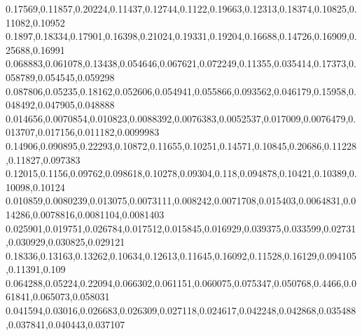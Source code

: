 0.17569,0.11857,0.20224,0.11437,0.12744,0.1122,0.19663,0.12313,0.18374,0.10825,0.11082,0.10952
0.1897,0.18334,0.17901,0.16398,0.21024,0.19331,0.19204,0.16688,0.14726,0.16909,0.25688,0.16991
0.068883,0.061078,0.13438,0.054646,0.067621,0.072249,0.11355,0.035414,0.17373,0.058789,0.054545,0.059298
0.087806,0.05235,0.18162,0.052606,0.054941,0.055866,0.093562,0.046179,0.15958,0.048492,0.047905,0.048888
0.014656,0.0070854,0.010823,0.0088392,0.0076383,0.0052537,0.017009,0.0076479,0.013707,0.017156,0.011182,0.0099983
0.14906,0.090895,0.22293,0.10872,0.11655,0.10251,0.14571,0.10845,0.20686,0.11228,0.11827,0.097383
0.12015,0.1156,0.09762,0.098618,0.10278,0.09304,0.118,0.094878,0.10421,0.10389,0.10098,0.10124
0.010859,0.0080239,0.013075,0.0073111,0.008242,0.0071708,0.015403,0.0064831,0.014286,0.0078816,0.0081104,0.0081403
0.025901,0.019751,0.026784,0.017512,0.015845,0.016929,0.039375,0.033599,0.02731,0.030929,0.030825,0.029121
0.18336,0.13163,0.13262,0.10634,0.12613,0.11645,0.16092,0.11528,0.16129,0.094105,0.11391,0.109
0.064288,0.05224,0.22094,0.066302,0.061151,0.060075,0.075347,0.050768,0.4466,0.061841,0.065073,0.058031
0.041594,0.03016,0.026683,0.026309,0.027118,0.024617,0.042248,0.042868,0.035488,0.037841,0.040443,0.037107
